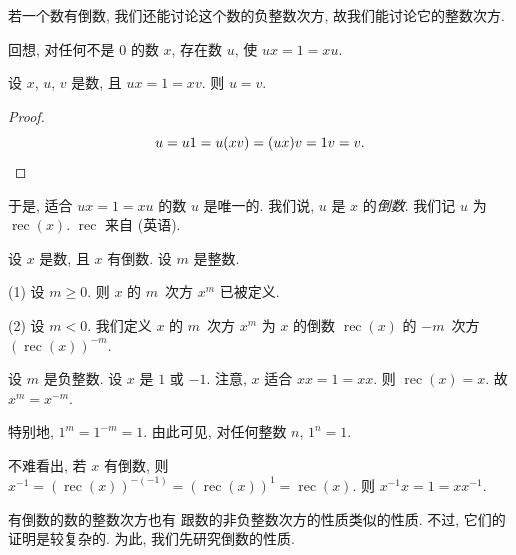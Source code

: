 \documentclass[../libro.tex]{subfiles}
\begin{document}
若一个数有倒数, 我们还能讨论这个数的负整数次方,
故我们能讨论它的整数次方.

回想, 对任何不是 \(0\) 的数 \(x\),
存在数 \(u\), 使 \(u x = 1 = x u\).

\begin{theorem}
    设 \(x\), \(u\), \(v\) 是数,
    且 \(u x = 1 = x v\).
    则 \(u = v\).
\end{theorem}

\begin{proof}
    \begin{equation*}
        u = u 1 = u (x v) = (u x) v = 1 v = v.
        \qedhere
    \end{equation*}
\end{proof}

于是,
适合 \(u x = 1 = x u\) 的数 \(u\) 是唯一的.
我们说, \(u\) 是 \(x\) 的\emph{倒数}.
我们记 \(u\) 为 \(\operatorname{rec} {(x)}\).
\(\operatorname{rec}\) 来自  (英语).

\begin{definition}
    设 \(x\) 是数, 且 \(x\) 有倒数.
    设 \(m\) 是整数.

    (1)
    设 \(m \geq 0\).
    则 \(x\) 的 \(m\)~次方 \(x^m\) 已被定义.

    (2)
    设 \(m < 0\).
    我们定义 \(x\) 的 \(m\)~次方 \(x^m\)
    为 \(x\) 的倒数 \(\operatorname{rec} {(x)}\)
    的 \(-m\)~次方 \((\operatorname{rec} {(x)})^{-m}\).
\end{definition}

\begin{example}
    设 \(m\) 是负整数.
    设 \(x\) 是 \(1\) 或 \(-1\).
    注意, \(x\) 适合 \(x x = 1 = x x\).
    则 \(\operatorname{rec} {(x)} = x\).
    故 \(x^m = x^{-m}\).

    特别地, \(1^m = 1^{-m} = 1\).
    由此可见, 对任何整数 \(n\), \(1^n = 1\).
\end{example}

不难看出, 若 \(x\) 有倒数,
则 \(x^{-1} = (\operatorname{rec} {(x)})^{-(-1)}
    = (\operatorname{rec} {(x)})^{1}
= \operatorname{rec} {(x)}\).
则 \(x^{-1} x = 1 = x x^{-1}\).

有倒数的数的整数次方也有%
跟数的非负整数次方的性质类似的性质.
不过, 它们的证明是较复杂的.
为此, 我们先研究倒数的性质.
\end{document}
